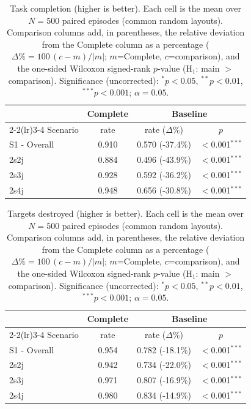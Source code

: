 
\begin{table}[ht]
  \centering
  \caption{Task completion (higher is better). Each cell is the mean over $N=500$ paired episodes (common random layouts). Comparison columns add, in parentheses, the relative deviation from the Complete column as a percentage ($\Delta\%=100\,(c-m)/|m|$; $m$=Complete, $c$=comparison), and the one-sided Wilcoxon signed-rank $p$-value (H$_1$: main $>$ comparison). Significance (uncorrected): $^{*}p<0.05$, $^{**}p<0.01$, $^{***}p<0.001$; $\alpha=0.05$.}
  \label{tab:wilcoxon-completion}
  \small
  \begin{tabular}{l c cc}
    \toprule
     & Complete & \multicolumn{2}{c}{Baseline} \\
    \cmidrule(lr){2-2}\cmidrule(lr){3-4}
    Scenario & {rate} & {rate ($\Delta$\%)} & {$p$} \\
    \midrule
    S1 - Overall & 0.910 & 0.570 (-37.4\%) & $<$0.001$^{***}$ \\
    2s2j & 0.884 & 0.496 (-43.9\%) & $<$0.001$^{***}$ \\
    2s3j & 0.928 & 0.592 (-36.2\%) & $<$0.001$^{***}$ \\
    2s4j & 0.948 & 0.656 (-30.8\%) & $<$0.001$^{***}$ \\
    \bottomrule
  \end{tabular}
\end{table}

\begin{table}[ht]
  \centering
  \caption{Targets destroyed (higher is better). Each cell is the mean over $N=500$ paired episodes (common random layouts). Comparison columns add, in parentheses, the relative deviation from the Complete column as a percentage ($\Delta\%=100\,(c-m)/|m|$; $m$=Complete, $c$=comparison), and the one-sided Wilcoxon signed-rank $p$-value (H$_1$: main $>$ comparison). Significance (uncorrected): $^{*}p<0.05$, $^{**}p<0.01$, $^{***}p<0.001$; $\alpha=0.05$.}
  \label{tab:wilcoxon-targets}
  \small
  \begin{tabular}{l c cc}
    \toprule
     & Complete & \multicolumn{2}{c}{Baseline} \\
    \cmidrule(lr){2-2}\cmidrule(lr){3-4}
    Scenario & {rate} & {rate ($\Delta$\%)} & {$p$} \\
    \midrule
    S1 - Overall & 0.954 & 0.782 (-18.1\%) & $<$0.001$^{***}$ \\
    2s2j & 0.942 & 0.734 (-22.0\%) & $<$0.001$^{***}$ \\
    2s3j & 0.971 & 0.807 (-16.9\%) & $<$0.001$^{***}$ \\
    2s4j & 0.980 & 0.834 (-14.9\%) & $<$0.001$^{***}$ \\
    \bottomrule
  \end{tabular}
\end{table}

